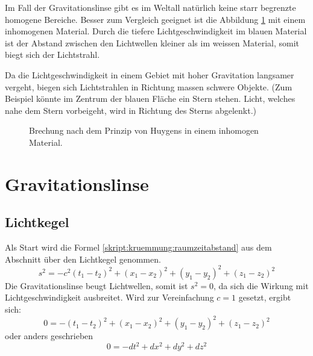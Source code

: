\begin{refsection}
Im Fall der Gravitationslinse gibt es im Weltall natürlich keine starr
begrenzte homogene Bereiche.  Besser zum Vergleich geeignet ist die
Abbildung \ref{fig:huygens3} mit einem inhomogenen Material.  Durch
die tiefere Lichtgeschwindigkeit im blauen Material ist der Abstand
zwischen den Lichtwellen kleiner als im weissen Material, somit biegt
sich der Lichtstrahl.

Da die Lichtgeschwindigkeit in einem Gebiet mit hoher Gravitation
langsamer vergeht, biegen sich Lichtstrahlen in Richtung massen
schwere Objekte.  (Zum Beispiel könnte im Zentrum der blauen Fläche
ein Stern stehen.  Licht, welches nahe dem Stern vorbeigeht, wird in
Richtung des Sterns abgelenkt.)

\begin{figure}
  \centering
  
  \caption{Brechung nach dem Prinzip von Huygens in einem inhomogen
    Material.}
  \label{fig:huygens3}
\end{figure}


\section{Gravitationslinse}
\subsection{Lichtkegel}
Als Start wird die Formel \eqref{skript:kruemmung:raumzeitabstand} aus
dem Abschnitt über den Lichtkegel genommen.
\begin{equation*}
  s^2 = -c^2 (t_1-t_2)^2 + (x_1-x_2)^2 + (y_1-y_2)^2 + (z_1-z_2)^2
\end{equation*}
Die Gravitationslinse beugt Lichtwellen, somit ist \(s^2=0\), da sich
die Wirkung mit Lichtgeschwindigkeit ausbreitet.  Wird zur
Vereinfachung \(c=1\) gesetzt, ergibt sich:
\begin{equation*}
  0 = -(t_1-t_2)^2 + (x_1-x_2)^2 + (y_1-y_2)^2 + (z_1-z_2)^2
\end{equation*}
oder anders geschrieben
\begin{equation*}
  0 = -dt^2 + dx^2 + dy^2 + dz^2
\end{equation*}


\end{refsection}

